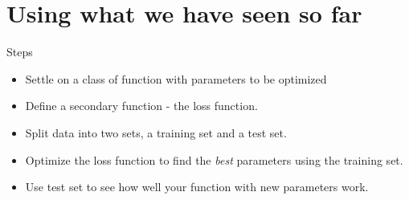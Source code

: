 \section{Using what we have seen so far}
\begin{frame}{Steps}
	\begin{itemize}
		\item Settle on a class of function with parameters  to be optimized
		 
		\item Define a secondary function - the loss function. 
		 
		\item Split data into two sets, a training set and a test set. 
	  
		\item Optimize the loss function  to find the {\it best} parameters using 
		the training set. 
		
		\item Use test set to see how well your function with new parameters work.
	\end{itemize}
\end{frame}
